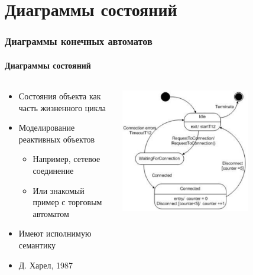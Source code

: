 \documentclass{../mcsslides}
\begin{document}
    \begin{frame}[plain]
        \titlepage
    \end{frame}

    \section{Диаграммы состояний}

    \begin{frame}
        \frametitle{Диаграммы конечных автоматов}
        \framesubtitle{Диаграммы состояний}
        \begin{columns}
            \begin{column}{0.5\textwidth}
                \begin{itemize}
                    \item Состояния объекта как часть жизненного цикла
                    \item Моделирование реактивных объектов
                    \begin{itemize}
                        \item Например, сетевое соединение
                        \item Или знакомый пример с торговым автоматом
                    \end{itemize}
                    \item Имеют исполнимую семантику
                    \item Д. Харел, 1987
                \end{itemize}
            \end{column}
            \begin{column}{0.5\textwidth}
                \begin{center}
                    \includegraphics[width=0.7\textwidth]{stateTransitionExample.png}
                \end{center}
            \end{column}
        \end{columns}
    \end{frame}
\end{document}
